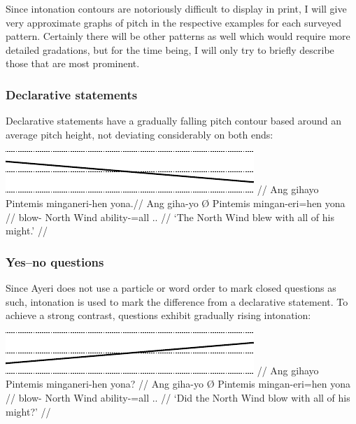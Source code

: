 Since intonation contours are notoriously difficult to display in print, I will 
give very approximate graphs of pitch in the respective examples for each 
surveyed pattern. Certainly there will be other patterns as well which would 
require more detailed gradations, but for the time being, I will only try to 
briefly describe those that are most prominent.

\subsubsection{Declarative statements}

Declarative statements have a gradually falling pitch contour based 
around an average pitch height, not deviating considerably on both ends:

\ex[belowexskip=0em]\begingl
	\glpreamble \raisebox{-1.5em}
		{\includegraphics{images/contours-statement.pdf}} //
	\gla Ang gihayo {} Pintemis minganeri-hen yona.//
	\glb Ang giha-yo Ø Pintemis mingan-eri=hen yona //
	\glc \AgtT{} blow-\TsgN{} \Top{} {North Wind} ability-\Ins{}=all
		\TsgN{}.\Gen{}. //
	\glft `The North Wind blew with all of his might.' //
\endgl\xe

\subsubsection{Yes–no questions}

Since Ayeri does not use a particle or word order to mark closed questions as 
such, intonation is used to mark the difference from a declarative statement. 
To achieve a strong contrast, questions exhibit gradually rising intonation:

\ex[belowexskip=0em]\begingl
	\glpreamble \raisebox{-1.5em}
		{\includegraphics{images/contours-ynquestion.pdf}} //
	\gla Ang gihayo {} Pintemis minganeri-hen yona? //
	\glb Ang giha-yo Ø Pintemis mingan-eri=hen yona //
	\glc \AgtT{} blow-\TsgN{} \Top{} {North Wind} ability-\Ins{}=all
		\TsgN{}.\Gen{}. //
	\glft `Did the North Wind blow with all of his might?' //
\endgl\xe

